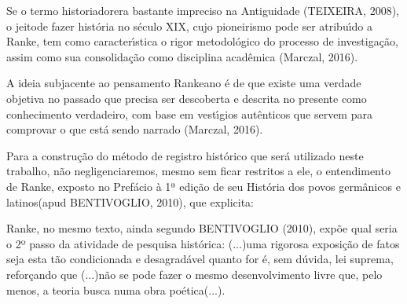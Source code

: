 \documentclass[
12pt,		%
openright,	%
twoside,  %
a4paper,			%
chapter=TITLE,		%
english,			%
french,				%
spanish,			%
brazil				%
]{USPSC-classe/USPSC}
\begin{document}
Se o termo \textquotedbl historiador\textquotedbl  era bastante impreciso na Antiguidade (TEIXEIRA, 2008), o \textquotedbl jeito\textquotedbl  de fazer hist\'oria no s\'eculo XIX, cujo pioneirismo pode ser atribu\'{\i}do a Ranke, tem como caracter\'{\i}stica \textquotedbl o rigor metodol\'ogico do processo de investiga\c{c}\~ao\textquotedbl , assim como sua consolida\c{c}\~ao como disciplina acad\^emica (Marczal, 2016).









A ideia subjacente ao pensamento Rankeano \'e de que existe uma verdade objetiva no passado que precisa ser descoberta e descrita no presente como \textquotedbl conhecimento verdadeiro\textquotedbl , com base em vest\'{\i}gios aut\^enticos que servem para comprovar o que est\'a sendo narrado (Marczal, 2016).









Para a constru\c{c}\~ao do m\'etodo de registro hist\'orico que ser\'a utilizado neste trabalho, n\~ao negligenciaremos, mesmo sem ficar restritos a ele, o entendimento de Ranke, exposto no Pref\'acio \`a 1ª edi\c{c}\~ao de seu \textquotedbl Hist\'oria dos povos germ\^anicos e latinos\textquotedbl   (apud BENTIVOGLIO, 2010), que explicita:










\noindent\begin{center}\mbox{\centering{}}\end{center}


Ranke, no mesmo texto, ainda segundo  BENTIVOGLIO (2010), exp\~oe qual seria o 2º passo da atividade de pesquisa hist\'orica: \textquotedbl (...)uma rigorosa exposi\c{c}\~ao de fatos seja esta t\~ao condicionada e desagrad\'avel quanto for \'e, sem d\'uvida, lei suprema\textquotedbl , refor\c{c}ando que \textquotedbl (...)n\~ao se pode fazer o mesmo desenvolvimento livre que, pelo menos, a teoria busca numa obra po\'etica(...)\textquotedbl .
\end{document}
